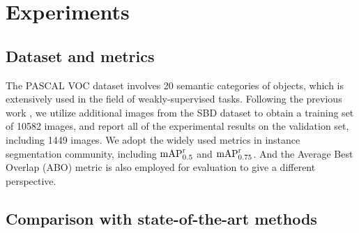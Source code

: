 \documentclass{article}
\begin{document}
\section{Experiments}
\label{sec:experimrnts}

\subsection{Dataset and metrics}
\label{ssec:dataset and Metrics}
The PASCAL VOC dataset involves 20 semantic categories of objects, which is extensively used in the field of weakly-supervised tasks.
Following the previous work \cite{Simple, PRM}, we utilize additional images from the SBD dataset \cite{SBD} to obtain a training set of 10582 images, and report all of the experimental results on the validation set, including 1449 images.
We adopt the widely used metrics in instance segmentation community, including ${\rm{mAP}}_{0.5}^{\rm{r}}$ and ${\rm{mAP}}_{0.75}^{\rm{r}}$. And the Average Best Overlap (ABO) \cite{ABO} metric is also employed for evaluation to give a different perspective.


\label{ssec: comparision}
\begin{table}[h]
\centering
\caption{Results of different methods on the PASCAL VOC 2012 val.}
\label{tab:the-state-of-the-art}
\end{table}

\subsection{Comparison with state-of-the-art methods}
\end{document}
